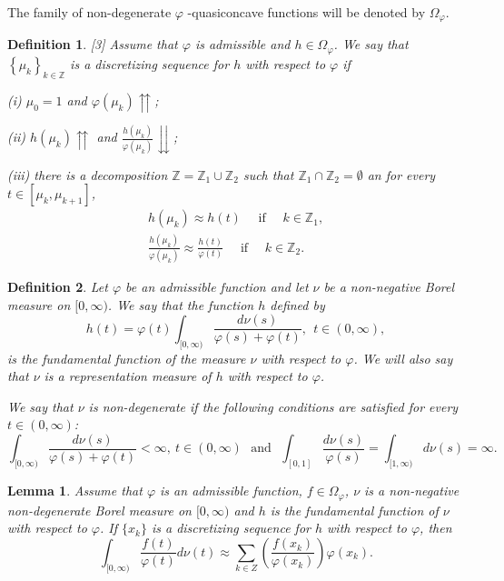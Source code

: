 \documentclass[12pt]{article}
\newtheorem{lemma}{\indent Lemma}
\newtheorem{definition}{\indent Definition}
\begin{document}
The family of non-degenerate $\varphi$ -quasiconcave functions will be denoted by $\Omega_\varphi$.

\begin{definition}\label{def14} [3] Assume that $\varphi$ is admissible and $h \in \Omega_{\varphi}$. We say that $\left\{\mu_k\right\}_{k \in \mathbb{Z}}$ is a discretizing sequence for $h$ with respect to $\varphi$ if

(i) $\mu_0=1$ and $\varphi\left(\mu_k\right)\upuparrows$;

(ii) $h\left(\mu_k\right) \upuparrows$ and $\frac{h\left(\mu_k\right)}{\varphi\left(\mu_k\right)}\downdownarrows$;

(iii) there is a decomposition $\mathbb{Z}=\mathbb{Z}_1 \cup \mathbb{Z}_2$ such that $\mathbb{Z}_1 \cap \mathbb{Z}_2=\emptyset$ an for every $t \in\left[\mu_k, \mu_{k+1}\right]$,
$$
\begin{gathered}
h\left(\mu_k\right) \approx h(t) \quad \text { if } \quad k \in \mathbb{Z}_1, \\
\frac{h\left(\mu_k\right)}{\varphi\left(\mu_k\right)} \approx \frac{h(t)}{\varphi(t)} \quad \text { if } \quad k \in \mathbb{Z}_2 .
\end{gathered}
$$
\end{definition}

\begin{definition}\label{def15}
Let $\varphi$ be an admissible function and let $\nu$ be a non-negative
Borel measure on $[0,\infty)$. We say that the function $h$ defined by
$$
h(t)=\varphi(t)\int_{[0,\infty)}\frac{d\nu(s)}{\varphi(s)+\varphi(t)},~~t\in(0,\infty),
$$
is the fundamental function of the measure $\nu$ with respect to
$\varphi$. We will also say that $\nu$ is a representation measure of
$h$ with respect to $\varphi$.

We say that $\nu$ is non-degenerate if the following conditions are
satisfied for every $t\in(0,\infty)$:
$$\int_{[0,\infty)}\frac{d\nu(s)}{\varphi(s)+\varphi(t)}<\infty,~t\in (0,\infty) ~~~\mbox{and}~~~ \int_{[0,1]}\frac{d\nu(s)}{\varphi(s)}=\int_{[1,\infty)}d\nu(s)=\infty.$$
\end{definition}

\begin{lemma}\label{lem6} 
Assume that $\varphi$ is an admissible function, $f\in\Omega_\varphi$,
$\nu$ is a non-negative non-degenerate Borel measure on $[0,\infty)$ and
$h$ is the fundamental function of $\nu$ with respect to $\varphi$. If
$\{x_k\}$ is a discretizing sequence for $h$ with respect to
$\varphi$, then
$$ \int_{[0,\infty)}\frac{f(t)}{\varphi(t)}d\nu(t)\approx
\sum_{k\in Z}\left(\frac{f(x_k)}{\varphi(x_k)}\right)
\varphi(x_k). $$
\end{lemma}
\end{document}
